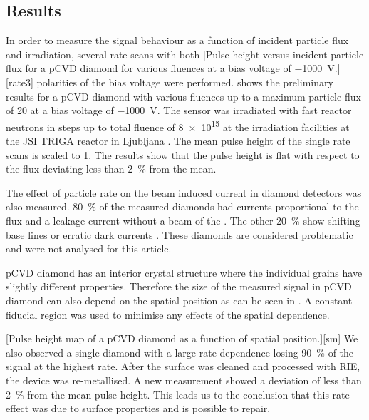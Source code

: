 \subsection{Results}
In order to measure the signal behaviour as a function of incident particle flux and irradiation, several rate scans with both 
[Pulse height versus incident particle flux for a \ac{pCVD} diamond for various fluences at a bias voltage of \SI{-1000}{\volt}.][rate3]
polarities of the bias voltage were performed.  shows the preliminary results for a \ac{pCVD} diamond with 
various fluences up to a maximum particle flux of \SI{20}{\mhzcm} at a bias voltage of \SI{-1000}{\volt}. The sensor was irradiated with fast reactor neutrons in steps up to total fluence of \SI{8e15}{\ncm} at the irradiation facilities at the JSI TRIGA reactor in Ljubljana \cite{irrad}. The mean pulse height of the single rate scans is scaled to 1. The results show that the pulse height is flat with respect to the flux deviating less than \SI{2}{\%} from the mean.\par 
The effect of particle rate on the beam induced current in diamond detectors was also measured. \SI{80}{\%} of the measured diamonds had currents proportional to the flux and a leakage current without a beam of the . The other \SI{20}{\%} show shifting base lines or erratic dark currents \cite{erratic}. These diamonds are considered problematic and were not analysed for this article.\par
\ac{pCVD} diamond has an interior crystal structure where the individual grains have slightly different properties. Therefore the size of the measured signal in \ac{pCVD} diamond can also depend on the spatial position as can be seen in . A constant fiducial region was used to minimise any effects of the spatial dependence. \par %
{}[Pulse height map of a \ac{pCVD} diamond as a function of spatial position.][sm]
We also observed a single diamond with a large rate dependence losing \SI{90}{\%} of the signal at the highest rate. After the surface was cleaned and processed with \ac{RIE}, the device was re-metallised. A new measurement showed a deviation of less than \SI{2}{\%} from the mean pulse height. This leads us to the conclusion that this rate effect was due to surface properties and is possible to repair.
